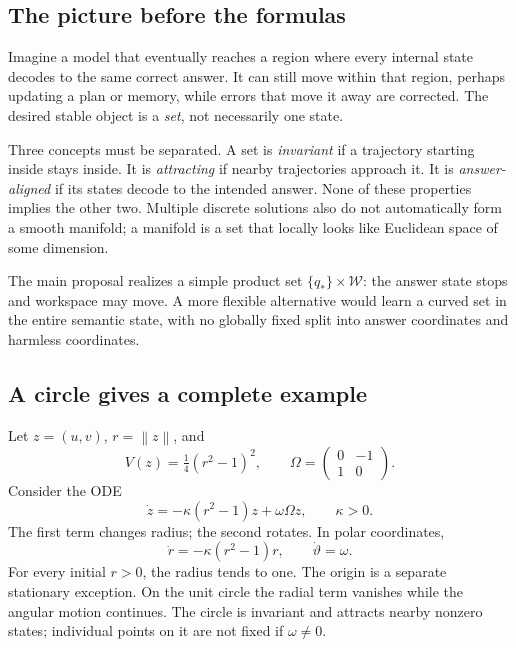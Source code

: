 \documentclass[11pt,a4paper]{article}
\newcommand{\norm}[1]{\left\lVert #1\right\rVert}
\begin{document}
\subsection{The picture before the formulas}
Imagine a model that eventually reaches a region where every internal state decodes to the same correct answer. It can still move within that region, perhaps updating a plan or memory, while errors that move it away are corrected. The desired stable object is a \emph{set}, not necessarily one state.

Three concepts must be separated. A set is \emph{invariant} if a trajectory starting inside stays inside. It is \emph{attracting} if nearby trajectories approach it. It is \emph{answer-aligned} if its states decode to the intended answer. None of these properties implies the other two. Multiple discrete solutions also do not automatically form a smooth manifold; a manifold is a set that locally looks like Euclidean space of some dimension.

The main proposal realizes a simple product set $\{q_*\}\times\mathcal W$: the answer state stops and workspace may move. A more flexible alternative would learn a curved set in the entire semantic state, with no globally fixed split into answer coordinates and harmless coordinates.

\subsection{A circle gives a complete example}
Let $z=(u,v)$, $r=\norm{z}$, and
\[
V(z)=\tfrac14(r^2-1)^2,\qquad
\Omega=\begin{pmatrix}0&-1\\1&0\end{pmatrix}.
\]
Consider the ODE
\[
\dot z=-\kappa(r^2-1)z+\omega\Omega z,\qquad \kappa>0.
\]
The first term changes radius; the second rotates. In polar coordinates,
\[
\dot r=-\kappa(r^2-1)r,\qquad \dot\vartheta=\omega.
\]
For every initial $r>0$, the radius tends to one. The origin is a separate stationary exception. On the unit circle the radial term vanishes while the angular motion continues. The circle is invariant and attracts nearby nonzero states; individual points on it are not fixed if $\omega\ne0$.

\begin{center}
\end{center}
\end{document}

